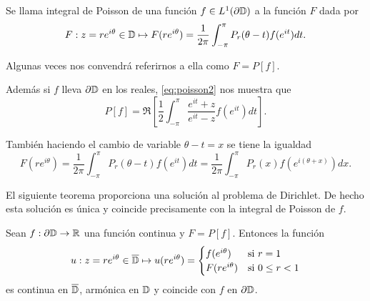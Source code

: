 \begin{definition}
    Se llama integral de Poisson de una función $f \in L^1(\partial \mathbb{D})$ a la función $F$ dada por
    \begin{equation*}
        F: z=re^{i \theta} \in \mathbb{D} \mapsto F(re^{i \theta}) = \dfrac{1}{2 \pi} \int_{- \pi}^{\pi} P_r (\theta - t) f(e^{it}) dt.
    \end{equation*}

    Algunas veces nos convendrá referirnos a ella como $F = P[f]$.
\end{definition}

Además si $f$ lleva $\partial \mathbb{D}$ en los reales, \eqref{eq:poisson2} nos muestra que %
\begin{equation*}
    P[f] = \Re \left[ \dfrac{1}{2} \int_{-\pi}^{\pi} \dfrac{e^{it} + z}{e^{it} - z} f(e^{it}) dt \right].
\end{equation*}

También haciendo el cambio de variable $\theta - t = x$ se tiene la igualdad
\begin{equation*}
    F(re^{i \theta}) = \dfrac{1}{2 \pi} \int_{- \pi}^{\pi} P_r (\theta - t) f(e^{it}) dt = \dfrac{1}{2 \pi} \int_{- \pi}^{\pi} P_r (x) f(e^{i(\theta + x)}) dx.
\end{equation*}

El siguiente teorema proporciona una solución al problema de Dirichlet. De hecho esta solución es única y coincide precisamente con la integral de Poisson de $f$. \\

\begin{theorem} %
    \label{th:fatouaux2}
    Sean $f:\partial \mathbb{D} \to \mathbb{R}$ una función continua y $F = P[f]$. Entonces la función
    \begin{equation*}
        u : z = re^{i \theta} \in \overline{\mathbb{D}} \mapsto u(re^{i \theta}) =
        \begin{cases}
            f(e^{i\theta}) & \text{si } r=1 \\
            F(re^{i\theta}) & \text{si } 0 \leq r<1
        \end{cases}
    \end{equation*}
    es continua en $\overline{\mathbb{D}}$, armónica en $\mathbb{D}$ y coincide con $f$ en $\partial \mathbb{D}$.
\end{theorem}


